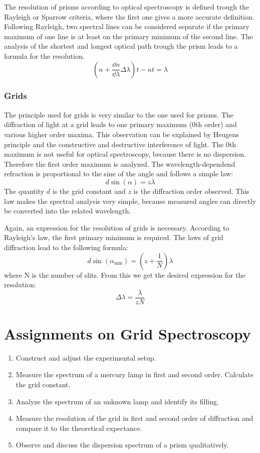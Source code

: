 \documentclass[a4paper,10pt]{article}
\begin{document}
The resolution of prisms according to optical spectroscopy is defined trough the Rayleigh or Sparrow criteria, where the first one gives a more accurate definition. Following Rayleigh, two spectral lines can be considered separate if the primary maximum of one line is at least on the primary minimum of the second line. The analysis of the shortest and longest optical path trough the prism leads to a formula for the resolution.
\begin{equation}
\left(n + \frac{\dd n}{\dd \lambda} \Delta\lambda \right) t - n t = \lambda
\end{equation}

\subsubsection*{Grids}
The principle used for grids is very similar to the one used for prisms. The diffraction of light at a grid leads to one primary maximum (0th order) and various higher order maxima. This observation can be explained by Heugens principle and the constructive and destructive interference of light. The 0th maximum is not useful for optical spectroscopy, because there is no dispersion. Therefore the first order maximum is analyzed. The wavelength-dependend refraction is proportional to the sine of the angle and follows a simple law:
\begin{equation}
d \sin(\alpha) = z \lambda \label{grid}
\end{equation}
The quantity $d$ is the grid constant and $z$ is the diffraction order observed. This law makes the spectral analysis very simple, because measured angles can directly be converted into the related wavelength.

Again, an expression for the resolution of grids is necessary. According to Rayleigh's law, the first primary minimum is required. The laws of grid diffraction lead to the following formula:
\begin{equation}
d \sin(\alpha_\text{min}) = \left(z + \frac{1}{N} \right) \lambda
\end{equation}
where N is the number of slits. From this we get the desired expression for the resolution:
\begin{equation}
\Delta \lambda = \frac{\lambda}{z N} \label{res}
\end{equation}
\section{Assignments on Grid Spectroscopy}
\begin{enumerate}
\item Construct and adjust the experimental setup.
\item Measure the spectrum of a mercury lamp in first and second order. Calculate the grid constant.
\item Analyze the spectrum of an unknown lamp and identify its filling.
\item Measure the resolution of the grid in first and second order of diffraction and compare it to the theoretical expectance.
\item Observe and discuss the dispersion spectrum of a prism qualitatively.
\end{enumerate}
\end{document}
